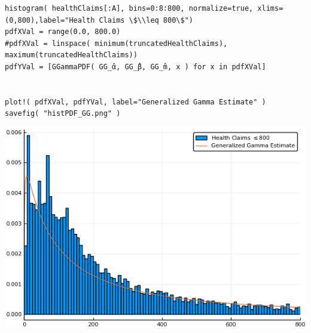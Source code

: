 \documentclass[12pt, letterpaper]{paper}
\begin{document}
\begin{verbatim}
histogram( healthClaims[:A], bins=0:8:800, normalize=true, xlims=(0,800),label="Health Claims \$\\leq 800\$")
pdfXVal = range(0.0, 800.0)
#pdfXVal = linspace( minimum(truncatedHealthClaims), maximum(truncatedHealthClaims))
pdfYVal = [GGammaPDF( GG_̂α, GG_̂β, GG_̂m, x ) for x in pdfXVal]


plot!( pdfXVal, pdfYVal, label="Generalized Gamma Estimate" )
savefig( "histPDF_GG.png" )
\end{verbatim}

\begin{center}
\includegraphics[width=.9\linewidth]{histPDF_GG.png}
\end{center}
\end{document}
